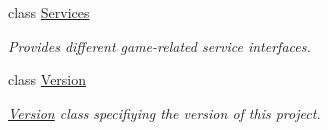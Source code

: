 \begin{DoxyCompactItemize}
class \hyperlink{class_tri_devs_1_1_tri_engine_1_1_services}{Services}
\begin{DoxyCompactList}\small\item\em Provides different game-\/related service interfaces. \end{DoxyCompactList}\item 
class \hyperlink{class_tri_devs_1_1_tri_engine_1_1_version}{Version}
\begin{DoxyCompactList}\small\item\em \hyperlink{class_tri_devs_1_1_tri_engine_1_1_version}{Version} class specifiying the version of this project. \end{DoxyCompactList}\end{DoxyCompactItemize}
